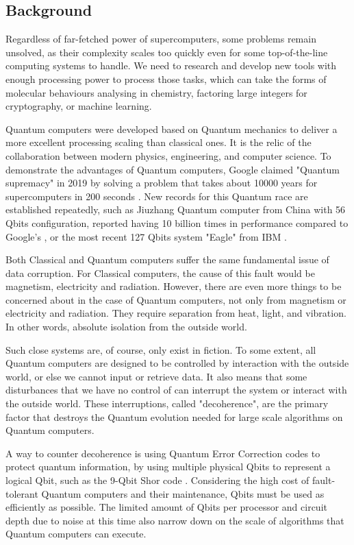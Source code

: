 \subsection{Background}

Regardless of  far-fetched power of supercomputers, some problems remain unsolved, as their complexity scales too quickly even for some top-of-the-line computing systems to handle. 
We need to research and develop new tools with enough processing power to process those tasks, which can take the forms of molecular behaviours analysing in chemistry, factoring large integers for cryptography, or machine learning.

Quantum computers were developed based on Quantum mechanics to deliver a more excellent processing scaling than classical ones.
It is the relic of the collaboration between modern physics, engineering, and computer science.
To demonstrate the advantages of Quantum computers, Google claimed "Quantum supremacy" in 2019 by solving a problem that takes about 10000 years for supercomputers in 200 seconds \cite{hsuGoogleQuantumTech2019}.
New records for this Quantum race are established repeatedly, such as Jiuzhang Quantum computer from China with 56 Qbits configuration, reported having 10 billion times in performance compared to Google's \cite{zhongQuantumComputationalAdvantage2020}, or the most recent 127 Qbits system "Eagle" from IBM \cite{chow2021ibm}.

Both Classical and Quantum computers suffer the same fundamental issue of data corruption.
For Classical computers, the cause of this fault would be magnetism, electricity and radiation.
However, there are even more things to be concerned about in the case of Quantum computers, not only from magnetism or electricity and radiation. They require separation from heat, light, and vibration. In other words, absolute isolation from the outside world.

Such close systems are, of course, only exist in fiction. 
To some extent, all Quantum computers are designed to be controlled by interaction with the outside world, or else we cannot input or retrieve data.
It also means that some disturbances that we have no control of can interrupt the system or interact with the outside world.
These interruptions, called "decoherence", are the primary factor that destroys the Quantum evolution needed for large scale algorithms on Quantum computers.

A way to counter decoherence is using Quantum Error Correction codes \cite{lidar2013quantum} to protect quantum information, by using multiple physical Qbits to represent a logical Qbit, such as the 9-Qbit Shor code \cite{shor1995scheme}.
Considering the high cost of fault-tolerant Quantum computers and their maintenance, Qbits must be used as efficiently as possible. 
The limited amount of Qbits per processor and circuit depth due to noise at this time also narrow down on the scale of algorithms that Quantum computers can execute.


